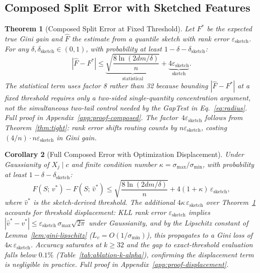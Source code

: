 \documentclass{article}
\newtheorem{theorem}{Theorem}[section]
\newtheorem{corollary}[theorem]{Corollary}
\begin{document}
\subsection{Composed Split Error with Sketched Features}
\label{sec:theory-composed}

\begin{theorem}[Composed Split Error at Fixed Threshold]
\label{thm:composed}
Let $F^*$ be the expected true Gini gain and $\widehat{F}$ the estimate
from a quantile sketch with rank error $\varepsilon_{\mathrm{sketch}}$.
For any $\delta, \delta_{\mathrm{sketch}} \in (0,1)$, with probability
at least $1 - \delta - \delta_{\mathrm{sketch}}$:
\begin{equation}
  |\widehat{F} - F^*| \leq
  \underbrace{\sqrt{\frac{8\ln(2dm/\delta)}{n}}}_{\text{statistical}}
  + \underbrace{4\varepsilon_{\mathrm{sketch}}}_{\text{sketch}}.
  \label{eq:composed-error}
\end{equation}
The statistical term uses factor 8 rather than 32 because bounding
$|\widehat{F} - F^*|$ at a fixed threshold requires only a two-sided
single-quantity concentration argument, not the simultaneous two-tail
control needed by the GapTest in Eq.~\eqref{eq:radius}.
Full proof in Appendix~\ref{app:proof-composed}.
The factor~$4\varepsilon_{\mathrm{sketch}}$ follows from Theorem~\ref{thm:tight}:
rank error shifts routing counts by $n\varepsilon_{\mathrm{sketch}}$, costing
$(4/n)\cdot n\varepsilon_{\mathrm{sketch}}$ in Gini gain.
\end{theorem}

\begin{corollary}[Full Composed Error with Optimization Displacement]
\label{cor:opt-displacement}
Under Gaussianity of $X_j \mid c$ and finite condition number
$\kappa = \sigma_{\max}/\sigma_{\min}$, with probability at least
$1 - \delta - \delta_{\mathrm{sketch}}$:
\begin{equation}
  F(S;\,v^*) - F(S;\,\hat{v}^*)
  \leq
  \sqrt{\frac{8\ln(2dm/\delta)}{n}}
  + 4(1+\kappa)\,\varepsilon_{\mathrm{sketch}},
  \label{eq:composed-full}
\end{equation}
where $\hat{v}^*$ is the sketch-derived threshold. The additional
$4\kappa\,\varepsilon_{\mathrm{sketch}}$ over Theorem~\ref{thm:composed}
accounts for threshold displacement: KLL rank error $\varepsilon_{\mathrm{sketch}}$
implies $|\hat{v}^* - v^*| \leq \varepsilon_{\mathrm{sketch}}\,\sigma_{\max}\sqrt{2\pi}$
under Gaussianity, and by the Lipschitz constant of Lemma~\ref{lem:gini-lipschitz}
($L_v = O(1/\sigma_{\min})$), this propagates to a Gini loss of
$4\kappa\,\varepsilon_{\mathrm{sketch}}$.
Accuracy saturates at $k \geq 32$ and the gap to exact-threshold
evaluation falls below $0.1\%$ (Table~\ref{tab:ablation-k-alpha}),
confirming the displacement term is negligible in practice.
Full proof in Appendix~\ref{app:proof-displacement}.
\end{corollary}
\end{document}
